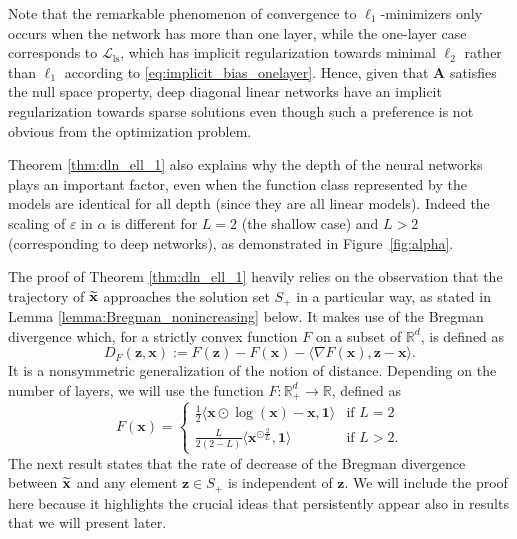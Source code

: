 \documentclass{svproc}
\newcommand{\corr}[1]{#1}
\newcommand{\bA}{\boldsymbol{A}}
\newcommand{\bx}{\boldsymbol{x}}
\newcommand{\bz}{\boldsymbol{z}}
\newcommand{\0}{\boldsymbol{0}}
\newcommand{\1}{\boldsymbol{1}}
\renewcommand{\tilde}{\widetilde}
\renewcommand{\epsilon}{\varepsilon}
\def\R{\mathbb{R}}
\def\GF{\text{GF}}
\def\Lls{\mathcal{L}_\text{ls}}
\def\Ldln{\mathcal{L}_\text{dln}}
\def\xprod{\tilde{\bf x}}
\def\IRone{\text{IR}_1}
\begin{document}

Note that the remarkable phenomenon of convergence to $\ell_1$-minimizers only occurs when the network has more than one layer, while the \corr{one-layer} case corresponds to $\Lls$\corr{,} which has implicit regularization towards minimal $\ell_2$ rather than $\ell_1$ according to \eqref{eq:implicit_bias_onelayer}. Hence, given that $\bA$ satisfies the null space property, deep diagonal linear \corr{networks} have an implicit regularization towards sparse solutions even though such \corr{a} preference is not obvious from the optimization problem. %

Theorem \ref{thm:dln_ell_1} also explains why the depth of the neural networks plays an important factor, even when the function class represented by the models are identical for all depth (since they are all linear models). Indeed the scaling of $\epsilon$ in $\alpha$ is different for $L=2$ (the shallow case) %
and $L>2$ (corresponding to deep networks),
as demonstrated in 
Figure~\ref{fig:alpha}. 

The proof of Theorem \ref{thm:dln_ell_1} heavily relies on the observation that the trajectory of $\xprod$ approaches the solution set $S_+$ in a particular way, as stated in Lemma \ref{lemma:Bregman_nonincreasing} below. It makes use of the Bregman divergence which, for a strictly convex function $F$ on a subset of $\R^d$, is defined as
\[
D_F(\bz,\bx):=F(\bz)-F(\bx)-\langle\nabla F(\bx),\bz-\bx\rangle.
\]
It is a nonsymmetric generalization of the notion of distance.
Depending on the number of layers, we will use the function $F : \R^d_+ \to \R$, defined as
\begin{equation}\label{eq:Breman_positive}
    F(\bx) 
    = \begin{cases}
    \frac{1}{2} \langle \bx \odot \log(\bx) - \bx, \1 \rangle & \text{if }L = 2\\
    \frac{L}{2(2-L)} \langle \bx^{\odot \frac{2}{L}}, \1 \rangle & \text{if }L > 2.
    \end{cases} 
\end{equation}
The next result states that the rate of decrease of the Bregman divergence between $\xprod$ and any element $\bz \in S_+$ is independent of $\bz$. We will include the proof here because it highlights the crucial ideas that persistently appear also in results that we will present later.
\end{document}
